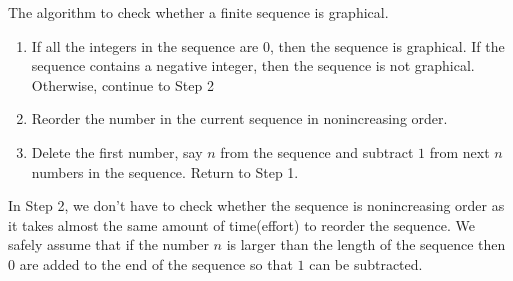 \begin{algorithm}
	The algorithm to check whether a finite sequence is graphical.
	\begin{enumerate}[label=Step \arabic*]
		\item If all the integers in the sequence are $0$, then the sequence is graphical.
			If the sequence contains a negative integer, then the sequence is not graphical.
			Otherwise, continue to Step 2
		\item Reorder the number in the current sequence in nonincreasing order.
		\item Delete the first number, say $n$ from the sequence and subtract $1$ from next $n$ numbers in the sequence. Return to Step 1.
	\end{enumerate}
	\begin{commentary}
		In Step 2, we don't have to check whether the sequence is nonincreasing order as it takes almost the same amount of time(effort) to reorder the sequence.
		We safely assume that if the number $n$ is larger than the length of the sequence then $0$ are added to the end of the sequence so that $1$ can be subtracted.
	\end{commentary}
\end{algorithm}

